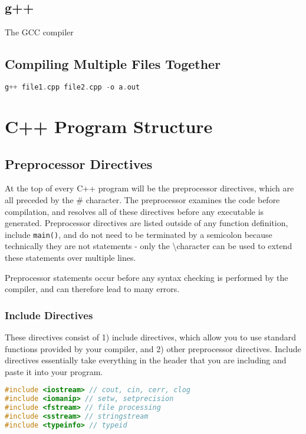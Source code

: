 \documentclass[10pt]{article}
\begin{document}
\subsection{g++}

The GCC compiler

\subsection{Compiling Multiple Files Together}

\begin{lstlisting}[language=C++]
g++ file1.cpp file2.cpp -o a.out
\end{lstlisting}

\section{C++ Program Structure}

\subsection{Preprocessor Directives}

At the top of every C++ program will be the preprocessor directives, which are all preceded by the \# character. The preprocessor examines the code before compilation, and resolves all of these directives before any executable is generated. Preprocessor directives are listed outside of any function definition, include \texttt{main()}, and do not need to be terminated by a semicolon because technically they are not statements - only the \textbackslash character can be used to extend these statements over multiple lines.

Preprocessor statements occur before any syntax checking is performed by the compiler, and can therefore lead to many errors. 

\subsubsection{Include Directives}

These directives consist of 1) include directives, which allow you to use standard functions provided by your compiler, and 2) other preprocessor directives. Include directives essentially take everything in the header that you are including and paste it into your program. 

\begin{lstlisting}[language=C++]
#include <iostream> // cout, cin, cerr, clog
#include <iomanip> // setw, setprecision
#include <fstream> // file processing
#include <sstream> // stringstream
#include <typeinfo> // typeid
\end{lstlisting}
\end{document}
